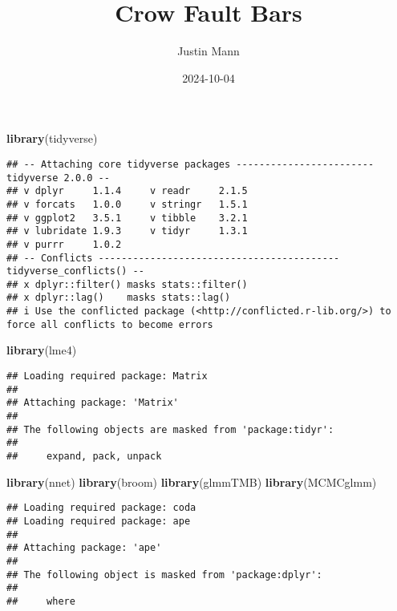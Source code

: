 \documentclass[
]{article}
\title{Crow Fault Bars}
\author{Justin Mann}
\date{2024-10-04}
\newenvironment{Shaded}{\begin{snugshade}}{\end{snugshade}}
\newcommand{\FunctionTok}[1]{\textcolor[rgb]{0.13,0.29,0.53}{\textbf{#1}}}
\newcommand{\NormalTok}[1]{#1}
\begin{document}
\maketitle

\begin{Shaded}
\begin{Highlighting}[]
\FunctionTok{library}\NormalTok{(tidyverse) }
\end{Highlighting}
\end{Shaded}

\begin{verbatim}
## -- Attaching core tidyverse packages ------------------------ tidyverse 2.0.0 --
## v dplyr     1.1.4     v readr     2.1.5
## v forcats   1.0.0     v stringr   1.5.1
## v ggplot2   3.5.1     v tibble    3.2.1
## v lubridate 1.9.3     v tidyr     1.3.1
## v purrr     1.0.2     
## -- Conflicts ------------------------------------------ tidyverse_conflicts() --
## x dplyr::filter() masks stats::filter()
## x dplyr::lag()    masks stats::lag()
## i Use the conflicted package (<http://conflicted.r-lib.org/>) to force all conflicts to become errors
\end{verbatim}

\begin{Shaded}
\begin{Highlighting}[]
\FunctionTok{library}\NormalTok{(lme4)}
\end{Highlighting}
\end{Shaded}

\begin{verbatim}
## Loading required package: Matrix
## 
## Attaching package: 'Matrix'
## 
## The following objects are masked from 'package:tidyr':
## 
##     expand, pack, unpack
\end{verbatim}

\begin{Shaded}
\begin{Highlighting}[]
\FunctionTok{library}\NormalTok{(nnet)}
\FunctionTok{library}\NormalTok{(broom)}
\FunctionTok{library}\NormalTok{(glmmTMB)}
\FunctionTok{library}\NormalTok{(MCMCglmm)}
\end{Highlighting}
\end{Shaded}

\begin{verbatim}
## Loading required package: coda
## Loading required package: ape
## 
## Attaching package: 'ape'
## 
## The following object is masked from 'package:dplyr':
## 
##     where
\end{verbatim}
\end{document}
